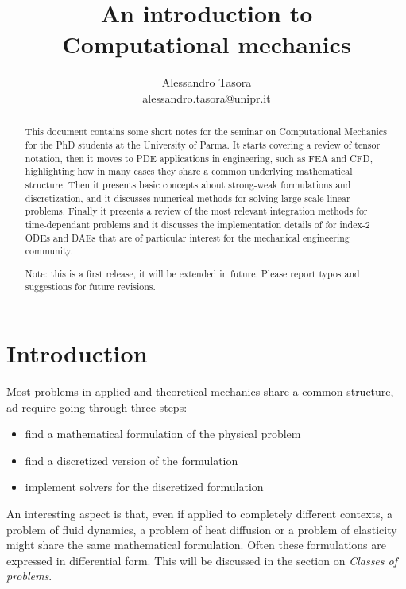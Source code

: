 \documentclass{digitaldynamics}
\begin{document}


\title{An introduction to \\ Computational mechanics}

\author{Alessandro Tasora \\ alessandro.tasora@unipr.it}

\maketitle
\thispagestyle{fancy}

\begin{abstract} 

This document contains some short notes for the seminar on Computational Mechanics
for the PhD students at the University of Parma. It starts covering a review of tensor notation,
then it moves to PDE applications in engineering, such as FEA and CFD, 
highlighting how in many cases they share a common underlying mathematical structure. Then it
presents basic concepts about strong-weak formulations and discretization, and it discusses
numerical methods for solving large scale linear problems. Finally it presents a review
of the most relevant integration methods for time-dependant problems and it discusses the
implementation details of for index-2 ODEs and DAEs that are of particular interest for the mechanical 
engineering community.  

Note: this is a first release, it will be extended in future. Please report typos and suggestions for future revisions.

\end{abstract}




\section{Introduction}

Most problems in applied and theoretical mechanics share a common structure, ad require going through three steps:
\begin{itemize}
	\item find a mathematical formulation of the physical problem
	\item find a discretized version of the formulation
	\item implement solvers for the discretized formulation
\end{itemize}

An interesting aspect is that, even if applied to completely different contexts, a problem of fluid dynamics, a problem of heat diffusion or a problem of elasticity might share the same mathematical formulation. Often these formulations are expressed in differential form. This will be discussed in the section on \textit{Classes of problems}.
\end{document}
